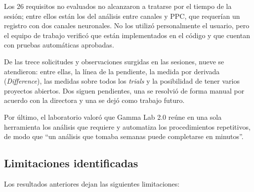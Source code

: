 \documentclass[12pt,letterpaper,oneside]{article}
\begin{document}
Los 26 requisitos no evaluados no alcanzaron a tratarse por el tiempo de la sesión; entre ellos están los del análisis entre canales y PPC, que requerían un registro con dos canales neuronales. No los utilizó personalmente el usuario, pero el equipo de trabajo verificó que están implementados en el código y que cuentan con pruebas automáticas aprobadas.

De las trece solicitudes y observaciones surgidas en las sesiones, nueve se atendieron: entre ellas, la línea de la pendiente, la medida por derivada (\textit{Difference}), las medidas sobre todos los \textit{trials} y la posibilidad de tener varios proyectos abiertos. Dos siguen pendientes, una se resolvió de forma manual por acuerdo con la directora y una se dejó como trabajo futuro.

Por último, el laboratorio valoró que Gamma Lab 2.0 reúne en una sola herramienta los análisis que requiere y automatiza los procedimientos repetitivos, de modo que ``un análisis que tomaba semanas puede completarse en minutos''.

\subsection{Limitaciones identificadas}
\label{sec:resultados_limitaciones}

Los resultados anteriores dejan las siguientes limitaciones:
\end{document}
